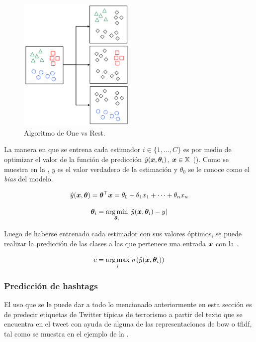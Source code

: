 \begin{figure}[H]
  \centering
  \includegraphics[width=0.5\textwidth]{Figures/one-vs-rest.pdf}
\decoRule
\caption[Algoritmo de One vs Rest]{Algoritmo de One vs Rest.}
\label{fig:ovr-algo}
\end{figure}

La manera en que se entrena cada estimador $i \in \{1, \ldots, C\}$ es por medio de optimizar el valor de la función de predicción $\hat{y}({\bm{x}}, {\bm{\theta}}_i)$, ${\bm{x}} \in {\mathbb{X}}$ (). Como se muestra en la , $y$ es el valor verdadero de la estimación y $\theta_0$ se le conoce como el \emph{bias} del modelo.

\begin{equation} \label{eq:linear-regression-training}
  \hat{y}({\bm{x}}, {\bm{\theta}}) = {\bm{\theta}}^{\top} {\bm{x}} = \theta_0 + \theta_1 x_1 + \cdots + \theta_n x_n
\end{equation}

\begin{equation} \label{eq:linear-regression-estimation}
  {\bm{\theta}}_i = \operatorname*{arg\,min}_{{\bm{\theta}}_i} | \hat{y}({\bm{x}}, {\bm{\theta}}_i) - y|
\end{equation}

Luego de haberse entrenado cada estimador con sus valores óptimos, se puede realizar la predicción de las clases a las que pertenece una entrada ${\bm{x}}$ con la .

\begin{equation} \label{eq:ovr-prediction}
  c = \operatorname*{arg\,max}_i \, \sigma(\hat{y}({\bm{x}}, {\bm{\theta}}_i))
\end{equation}

\subsubsection{Predicción de hashtags}
El uso que se le puede dar a todo lo mencionado anteriormente en esta sección es de predecir etiquetas de Twitter típicas de terrorismo a partir del texto que se encuentra en el tweet con ayuda de alguna de las representaciones de \gls{bow} o \gls{tfidf}, tal como se muestra en el ejemplo de la .

